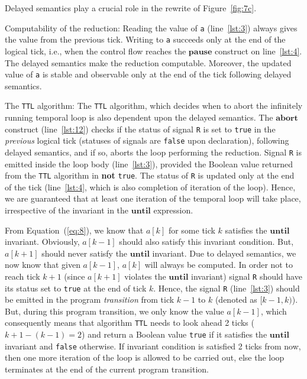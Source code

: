 \documentclass[10pt,journal,cspaper,compsoc]{IEEEtran}
\begin{document}
Delayed semantics play a crucial role in the rewrite of
Figure~\ref{fig:7c}.
\begin{compactitem}
\item Computability of the reduction: Reading the value of \texttt{a}
  (line~\ref{lst:3}) always gives the value from the previous
  tick. Writing to \texttt{a} succeeds only at the end of the logical
  tick, i.e., when the control flow reaches the $\mathbf{pause}$
  construct on line~\ref{lst:4}. The delayed semantics make the
  reduction computable. Moreover, the updated value of \texttt{a} is
  stable and observable only at the end of the tick following delayed
  semantics.
\item The \texttt{TTL} algorithm: The \texttt{TTL} algorithm, which
  decides when to abort the infinitely running temporal loop is also
  dependent upon the delayed semantics. The $\mathbf{abort}$ construct
  (line~\ref{lst:12}) checks if the status of signal \texttt{R} is set
  to \texttt{true} in the \textit{previous} logical tick (statuses of
  signals are \texttt{false} upon declaration), following delayed
  semantics, and if so, aborts the loop performing the reduction. Signal
  \texttt{R} is emitted inside the loop body (line~\ref{lst:3}),
  provided the Boolean value returned from the \texttt{TTL} algorithm in
  \textbf{not} \texttt{true}. The status of \texttt{R} is updated only
  at the end of the tick (line~\ref{lst:4}, which is also completion of
  iteration of the loop). Hence, we are guaranteed that at least one
  iteration of the temporal loop will take place, irrespective of the
  invariant in the $\mathbf{until}$ expression.
  
  From Equation~(\ref{eq:8}), we know that $a[k]$ for some tick $k$
  satisfies the $\mathbf{until}$ invariant. Obviously, $a[k-1]$ should
  also satisfy this invariant condition. But, $a[k+1]$ should never
  satisfy the $\mathbf{until}$ invariant. Due to delayed semantics, we
  now know that given $a[k-1]$, $a[k]$ will always be computed. In order
  not to reach tick $k+1$ (since $a[k+1]$ violates the $\mathbf{until}$
  invariant) signal \texttt{R} should have its status set to
  \texttt{true} at the end of tick $k$. Hence, the signal \texttt{R}
  (line~\ref{lst:3}) should be emitted in the program
  \textit{transition} from tick $k-1$ to $k$ (denoted as
  $[k-1,k)$). But, during this program transition, we only know the
  value $a[k-1]$, which consequently means that algorithm \texttt{TTL}
  needs to look ahead 2 ticks ($k+1-(k-1)=2$) and return a Boolean value
  \texttt{true} if it satisfies the $\mathbf{until}$ invariant and
  \texttt{false} otherwise. If invariant condition is satisfied 2 ticks
  from now, then one more iteration of the loop is allowed to be carried
  out, else the loop terminates at the end of the current program
  transition.
\end{compactitem}
\end{document}
